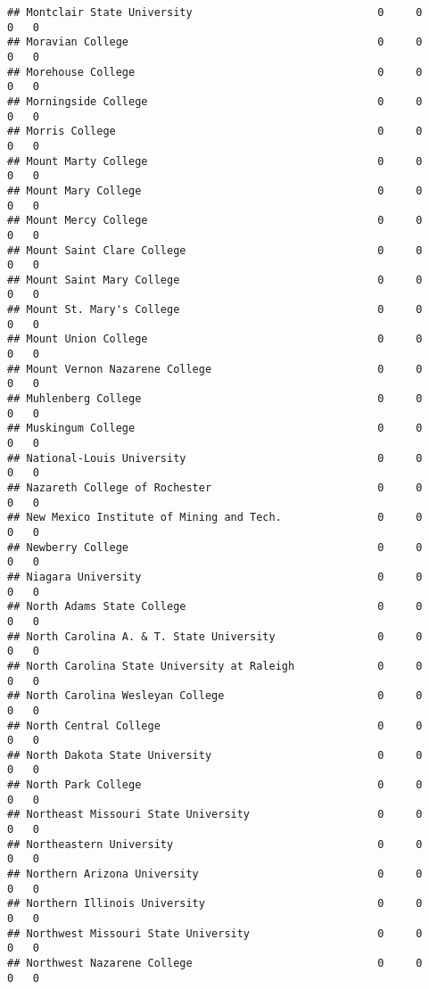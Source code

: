 \documentclass[
]{article}
\begin{document}
\begin{verbatim}
## Montclair State University                             0     0        0   0
## Moravian College                                       0     0        0   0
## Morehouse College                                      0     0        0   0
## Morningside College                                    0     0        0   0
## Morris College                                         0     0        0   0
## Mount Marty College                                    0     0        0   0
## Mount Mary College                                     0     0        0   0
## Mount Mercy College                                    0     0        0   0
## Mount Saint Clare College                              0     0        0   0
## Mount Saint Mary College                               0     0        0   0
## Mount St. Mary's College                               0     0        0   0
## Mount Union College                                    0     0        0   0
## Mount Vernon Nazarene College                          0     0        0   0
## Muhlenberg College                                     0     0        0   0
## Muskingum College                                      0     0        0   0
## National-Louis University                              0     0        0   0
## Nazareth College of Rochester                          0     0        0   0
## New Mexico Institute of Mining and Tech.               0     0        0   0
## Newberry College                                       0     0        0   0
## Niagara University                                     0     0        0   0
## North Adams State College                              0     0        0   0
## North Carolina A. & T. State University                0     0        0   0
## North Carolina State University at Raleigh             0     0        0   0
## North Carolina Wesleyan College                        0     0        0   0
## North Central College                                  0     0        0   0
## North Dakota State University                          0     0        0   0
## North Park College                                     0     0        0   0
## Northeast Missouri State University                    0     0        0   0
## Northeastern University                                0     0        0   0
## Northern Arizona University                            0     0        0   0
## Northern Illinois University                           0     0        0   0
## Northwest Missouri State University                    0     0        0   0
## Northwest Nazarene College                             0     0        0   0

\end{verbatim}
\end{document}
